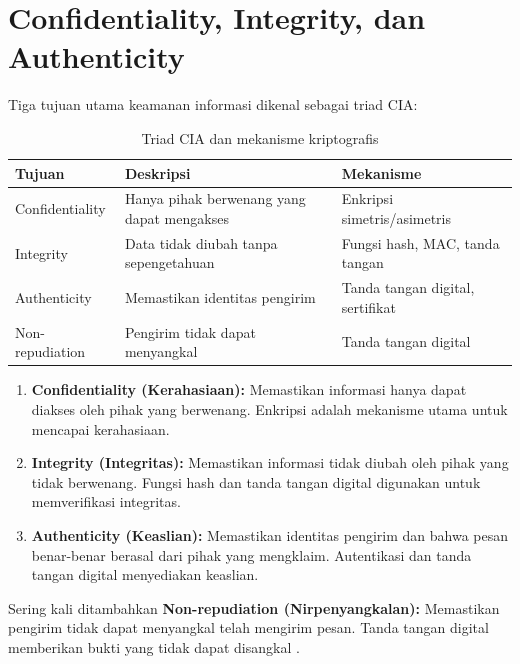 \section{Confidentiality, Integrity, dan Authenticity}

Tiga tujuan utama keamanan informasi dikenal sebagai triad CIA:

\begin{table}[!htbp]
\centering
\caption{Triad CIA dan mekanisme kriptografis}
\label{tab:cia}
\begin{tabular}{@{}>{\raggedright\arraybackslash}p{}>{\raggedright\arraybackslash}p{}>{\raggedright\arraybackslash}p{}@{}}
\toprule
\textbf{Tujuan} & \textbf{Deskripsi} & \textbf{Mekanisme} \\
\midrule
Confidentiality & Hanya pihak berwenang yang dapat mengakses & Enkripsi simetris/asimetris \\
Integrity & Data tidak diubah tanpa sepengetahuan & Fungsi hash, MAC, tanda tangan \\
Authenticity & Memastikan identitas pengirim & Tanda tangan digital, sertifikat \\
Non-repudiation & Pengirim tidak dapat menyangkal & Tanda tangan digital \\
\bottomrule
\end{tabular}
\end{table}

\begin{enumerate}
\item \textbf{Confidentiality (Kerahasiaan):} Memastikan informasi hanya dapat diakses oleh pihak yang berwenang. Enkripsi adalah mekanisme utama untuk mencapai kerahasiaan.
\item \textbf{Integrity (Integritas):} Memastikan informasi tidak diubah oleh pihak yang tidak berwenang. Fungsi hash dan tanda tangan digital digunakan untuk memverifikasi integritas.
\item \textbf{Authenticity (Keaslian):} Memastikan identitas pengirim dan bahwa pesan benar-benar berasal dari pihak yang mengklaim. Autentikasi dan tanda tangan digital menyediakan keaslian.
\end{enumerate}

Sering kali ditambahkan \textbf{Non-repudiation (Nirpenyangkalan):} Memastikan pengirim tidak dapat menyangkal telah mengirim pesan. Tanda tangan digital memberikan bukti yang tidak dapat disangkal \cite{stallings2017,ferguson2010}.
